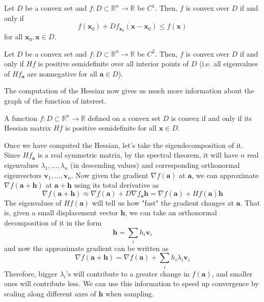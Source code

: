   \begin{theorem}
  Let $D$ be a convex set and $f: D \subset \mathbb{R}^n \longrightarrow \mathbb{R}$ be $C^1$. Then, $f$ is convex over $D$ if and only if 
  \[f(\mathbf{x}_0) + D f_{\mathbf{x}_0} (\mathbf{x} - \mathbf{x}_0) \leq f(\mathbf{x})\]
  for all $\mathbf{x}_0, \mathbf{x} \in D$. 
  \end{theorem}

  \begin{theorem}
  Let $D$ be a convex set and $f: D \subset \mathbb{R}^n \longrightarrow \mathbb{R}$ be $C^2$. Then, $f$ is convex over $D$ if and only if $H f$ is positive semidefinite over all interior points of $D$ (i.e. all eigenvalues of $H f_\mathbf{a}$ are nonnegative for all $\mathbf{a} \in D$). 
  \end{theorem}

  The computation of the Hessian now gives us much more information about the graph of the function of interest. 

  \begin{theorem}
  A function $f: D \subset \mathbb{R}^n \longrightarrow \mathbb{R}$ defined on a convex set $D$ is convex if and only if its Hessian matrix $H f$ is positive semidefinite for all $\mathbf{x} \in D$. 
  \end{theorem} 

  Once we have computed the Hessian, let's take the eigendecomposition of it. Since $H f_\mathbf{a}$ is a real symmetric matrix, by the spectral theorem, it will have $n$ real eigenvalues $\lambda_1, \ldots, \lambda_n$ (in descending values) and corresponding orthonormal eigenvectors $\mathbf{v}_1, \ldots, \mathbf{v}_n$. Now given the gradient $\nabla f(\mathbf{a})$ at $\mathbf{a}$, we can approximate $\nabla f(\mathbf{a} + \mathbf{h})$ at $\mathbf{a} + \mathbf{h}$ using its total derivative as 
  \[\nabla f(\mathbf{a} + \mathbf{h}) \approx \nabla f(\mathbf{a}) + D \nabla f_\mathbf{a} \mathbf{h} = \nabla f(\mathbf{a}) + H f(\mathbf{a}) \mathbf{h}\]
  The eigenvalues of $H f(\mathbf{a})$ will tell us how "fast" the gradient changes at $\mathbf{a}$. That is, given a small displacement vector $\mathbf{h}$, we can take an orthonormal decomposition of it in the form 
  \[\mathbf{h} = \sum_{i} h_i \mathbf{v}_i\]
  and now the approximate gradient can be written as 
  \[\nabla f (\mathbf{a} + \mathbf{h}) = \nabla f(\mathbf{a}) + \sum_i h_i \lambda_i \mathbf{v}_i\]
  Therefore, bigger $\lambda_i$'s will contribute to a greater change in $f(\mathbf{a})$, and smaller ones will contribute less. We can use this information to speed up convergence by scaling along different axes of $\mathbf{h}$ when sampling. 

